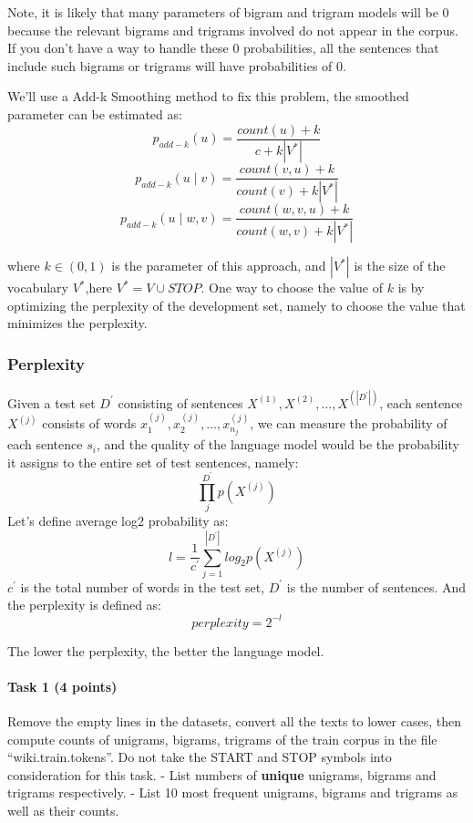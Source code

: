 \documentclass[11pt]{article}
\begin{document}
Note, it is likely that many parameters of bigram and trigram models
will be 0 because the relevant bigrams and trigrams involved do not
appear in the corpus. If you don't have a way to handle these 0
probabilities, all the sentences that include such bigrams or trigrams
will have probabilities of 0.

We'll use a Add-k Smoothing method to fix this problem, the smoothed
parameter can be estimated as:
\[p_{add-k}(u)= \frac{count(u)+k}{c+k|V^*|}\]
\[p_{add-k}(u \mid v)= \frac{count(v, u)+k}{count(v)+k|V^*|}\]
\[p_{add-k}(u \mid w, v)= \frac{count(w, v, u)+k}{count(w, v)+k|V^*|}\]

where \(k \in (0, 1)\) is the parameter of this approach, and \(|V^*|\)
is the size of the vocabulary \(V^*\),here \(V^*= V \cup STOP\). One way
to choose the value of \(k\) is by optimizing the perplexity of the
development set, namely to choose the value that minimizes the
perplexity.

    \hypertarget{perplexity}{%
\subsubsection{Perplexity}\label{perplexity}}

Given a test set \(D^{\prime}\) consisting of sentences
\(X^{(1)}, X^{(2)}, …, X^{(|D^{\prime}|)}\), each sentence \(X^{(j)}\)
consists of words \(x_1^{(j)}, x_2^{(j)},…,x_{n_j}^{(j)}\), we can
measure the probability of each sentence \(s_i\), and the quality of the
language model would be the probability it assigns to the entire set of
test sentences, namely: \[\prod_j^{D^{\prime}}p(X^{(j)})\] Let's define
average log2 probability as:
\[l=\frac{1}{c^{\prime}}\sum_{j=1}^{|D^{\prime}|}log_2p(X^{(j)})\]
\(c^{\prime}\) is the total number of words in the test set,
\(D^{\prime}\) is the number of sentences. And the perplexity is defined
as: \[perplexity=2^{-l}\]

The lower the perplexity, the better the language model.

    \hypertarget{task-1-4-points}{%
\paragraph{Task 1 (4 points)}\label{task-1-4-points}}

Remove the empty lines in the datasets, convert all the texts to lower
cases, then compute counts of unigrams, bigrams, trigrams of the train
corpus in the file ``wiki.train.tokens''. Do not take the START and STOP
symbols into consideration for this task. - List numbers of
\textbf{unique} unigrams, bigrams and trigrams respectively. - List 10
most frequent unigrams, bigrams and trigrams as well as their counts.
\end{document}
